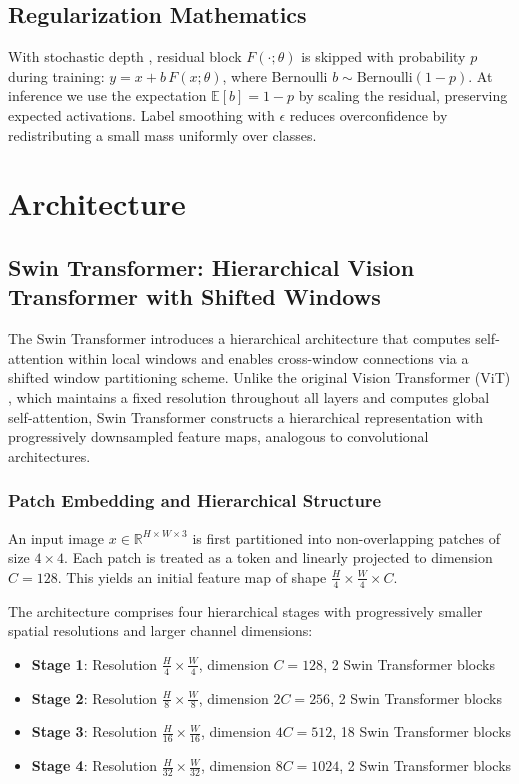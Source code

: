 \documentclass[11pt,a4paper]{article}
\begin{document}
\subsection{Regularization Mathematics}
With stochastic depth \cite{huang2016stochasticdepth}, residual block \(F(\cdot;\theta)\) is skipped with probability \(p\) during training: \(y = x + b\,F(x;\theta)\), where Bernoulli \(b\sim\mathrm{Bernoulli}(1{-}p)\). At inference we use the expectation \(\mathbb{E}[b]=1{-}p\) by scaling the residual, preserving expected activations. Label smoothing with \(\epsilon\) reduces overconfidence by redistributing a small mass uniformly over classes.

\section{Architecture}

\subsection{Swin Transformer: Hierarchical Vision Transformer with Shifted Windows}

The Swin Transformer \cite{liu2021swin} introduces a hierarchical architecture that computes self-attention within local windows and enables cross-window connections via a shifted window partitioning scheme. Unlike the original Vision Transformer (ViT) \cite{dosovitskiy2021vit}, which maintains a fixed resolution throughout all layers and computes global self-attention, Swin Transformer constructs a hierarchical representation with progressively downsampled feature maps, analogous to convolutional architectures.

\subsubsection{Patch Embedding and Hierarchical Structure}

An input image \(x \in \mathbb{R}^{H \times W \times 3}\) is first partitioned into non-overlapping patches of size \(4 \times 4\). Each patch is treated as a token and linearly projected to dimension \(C=128\). This yields an initial feature map of shape \(\frac{H}{4} \times \frac{W}{4} \times C\).

The architecture comprises four hierarchical stages with progressively smaller spatial resolutions and larger channel dimensions:

\begin{itemize}[leftmargin=*]
    \item \textbf{Stage 1}: Resolution \(\frac{H}{4} \times \frac{W}{4}\), dimension \(C=128\), 2 Swin Transformer blocks
    \item \textbf{Stage 2}: Resolution \(\frac{H}{8} \times \frac{W}{8}\), dimension \(2C=256\), 2 Swin Transformer blocks
    \item \textbf{Stage 3}: Resolution \(\frac{H}{16} \times \frac{W}{16}\), dimension \(4C=512\), 18 Swin Transformer blocks
    \item \textbf{Stage 4}: Resolution \(\frac{H}{32} \times \frac{W}{32}\), dimension \(8C=1024\), 2 Swin Transformer blocks
\end{itemize}
\end{document}
